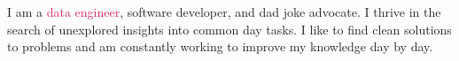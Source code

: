 \documentclass[9pt]{developercv} %
\begin{document}
\vspace{1cm}



\begin{minipage}[t]{1\textwidth} %
	\vspace{-\baselineskip} %
	
	I am a \textcolor[HTML]{d81e5b}{data engineer}, software developer, and dad joke advocate. I thrive in the search of unexplored insights into common day tasks.
	I like to find clean solutions to problems and am constantly working to improve my knowledge day by day.
	
\end{minipage}

\vspace{0.5cm}
\end{document}

